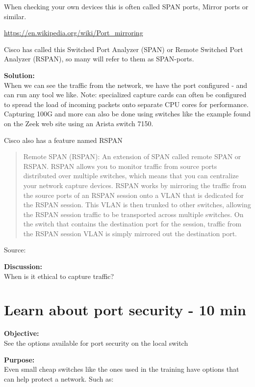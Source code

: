 \documentclass[a4paper,11pt,notitlepage]{report}
\begin{document}
When checking your own devices this is often called SPAN ports, Mirror ports or similar.

\url{https://en.wikipedia.org/wiki/Port_mirroring}

Cisco has called this Switched Port Analyzer (SPAN) or Remote Switched Port Analyzer (RSPAN), so many will refer to them as SPAN-ports.

{\bf Solution:}\\
When we can see the traffic from the network, we have the port configured - and can run any tool we like. Note: specialized capture cards can often be configured to spread the load of incoming packets onto separate CPU cores for performance. Capturing 100G and more can also be done using switches like the example found on the Zeek web site using an Arista switch 7150.

Cisco also has a feature named RSPAN

\begin{quote}
Remote SPAN (RSPAN): An extension of SPAN called remote SPAN or RSPAN. RSPAN allows you to monitor traffic from source ports distributed over multiple switches, which means that you can centralize your network capture devices. RSPAN works by mirroring the traffic from the source ports of an RSPAN session onto a VLAN that is dedicated for the RSPAN session. This VLAN is then trunked to other switches, allowing the RSPAN session traffic to be transported across multiple switches. On the switch that contains the destination port for the session, traffic from the RSPAN session VLAN is simply mirrored out the destination port.
\end{quote}
Source: {\small{}}



{\bf Discussion:}\\
When is it ethical to capture traffic?


\chapter{Learn about port security - 10 min}
\label{ex:port-security}

{\bf Objective:}\\
See the options available for port security on the local switch

{\bf Purpose:}\\
Even small cheap switches like the ones used in the training have options that can help protect a network. Such as:
\end{document}

